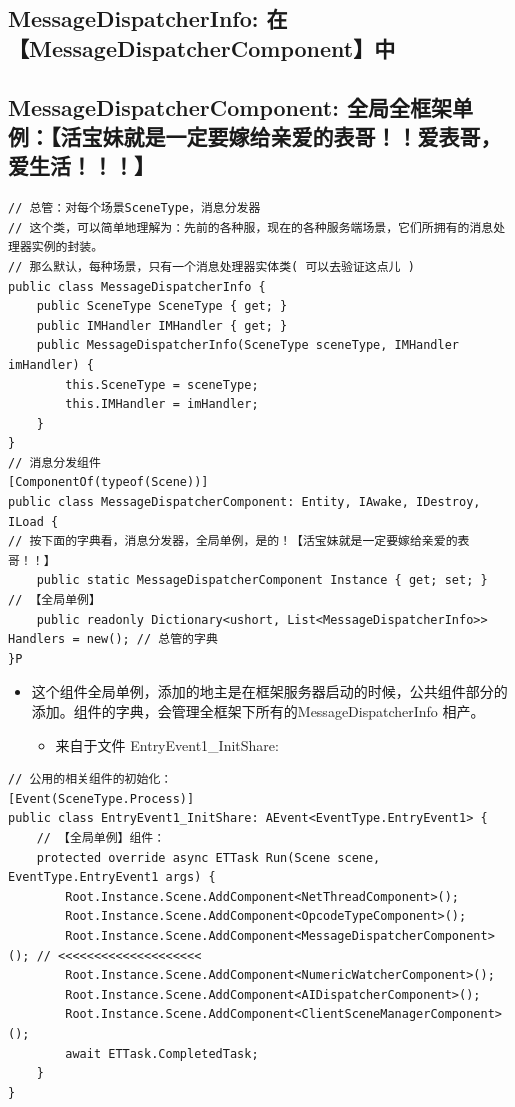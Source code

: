 \documentclass[9pt, b5paper]{article}
\begin{document}
\subsection{MessageDispatcherInfo: 在【MessageDispatcherComponent】中}
\label{sec-3-12}
\subsection{MessageDispatcherComponent: 全局全框架单例：【活宝妹就是一定要嫁给亲爱的表哥！！爱表哥，爱生活！！！】}
\label{sec-3-13}
\begin{verbatim}
// 总管：对每个场景SceneType，消息分发器
// 这个类，可以简单地理解为：先前的各种服，现在的各种服务端场景，它们所拥有的消息处理器实例的封装。
// 那么默认，每种场景，只有一个消息处理器实体类( 可以去验证这点儿 )
public class MessageDispatcherInfo { 
    public SceneType SceneType { get; }
    public IMHandler IMHandler { get; }
    public MessageDispatcherInfo(SceneType sceneType, IMHandler imHandler) {
        this.SceneType = sceneType;
        this.IMHandler = imHandler;
    }
}
// 消息分发组件
[ComponentOf(typeof(Scene))]
public class MessageDispatcherComponent: Entity, IAwake, IDestroy, ILoad {
// 按下面的字典看，消息分发器，全局单例，是的！【活宝妹就是一定要嫁给亲爱的表哥！！】
    public static MessageDispatcherComponent Instance { get; set; }  // 【全局单例】 
    public readonly Dictionary<ushort, List<MessageDispatcherInfo>> Handlers = new(); // 总管的字典
}P
\end{verbatim}
\begin{itemize}
\item 这个组件全局单例，添加的地主是在框架服务器启动的时候，公共组件部分的添加。组件的字典，会管理全框架下所有的MessageDispatcherInfo 相产。
\begin{itemize}
\item 来自于文件 EntryEvent1\_InitShare:
\end{itemize}
\end{itemize}
\begin{verbatim}
// 公用的相关组件的初始化：
[Event(SceneType.Process)]
public class EntryEvent1_InitShare: AEvent<EventType.EntryEvent1> {
    // 【全局单例】组件：
    protected override async ETTask Run(Scene scene, EventType.EntryEvent1 args) {
        Root.Instance.Scene.AddComponent<NetThreadComponent>();
        Root.Instance.Scene.AddComponent<OpcodeTypeComponent>();
        Root.Instance.Scene.AddComponent<MessageDispatcherComponent>(); // <<<<<<<<<<<<<<<<<<<< 
        Root.Instance.Scene.AddComponent<NumericWatcherComponent>();
        Root.Instance.Scene.AddComponent<AIDispatcherComponent>();
        Root.Instance.Scene.AddComponent<ClientSceneManagerComponent>();
        await ETTask.CompletedTask;
    }
}
\end{verbatim}
\end{document}
